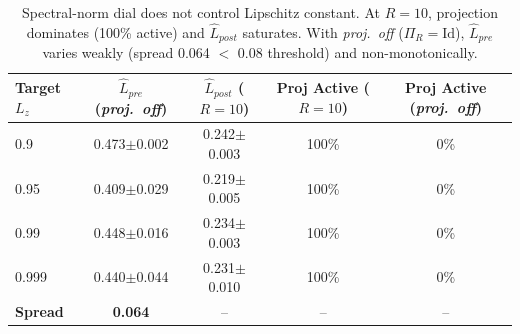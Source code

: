 \begin{table}[t]
\centering
\caption{Spectral-norm dial does not control Lipschitz constant. At $R{=}10$, projection dominates (100\% active) and $\hat{L}_{post}$ saturates. With \emph{proj.\ off} ($\Pi_R=\mathrm{Id}$), $\hat{L}_{pre}$ varies weakly (spread 0.064 $<$ 0.08 threshold) and non-monotonically.}
\label{tab:exp2_dial_failure}
\begin{tabular}{lcccc}
\toprule
Target $L_z$ & $\hat{L}_{pre}$ (\emph{proj.\ off}) & $\hat{L}_{post}$ ($R{=}10$) & Proj Active ($R{=}10$) & Proj Active (\emph{proj.\ off}) \\
\midrule
  0.9 & 0.473$\pm$0.002 & 0.242$\pm$0.003 & 100\% & 0\% \\
  0.95 & 0.409$\pm$0.029 & 0.219$\pm$0.005 & 100\% & 0\% \\
  0.99 & 0.448$\pm$0.016 & 0.234$\pm$0.003 & 100\% & 0\% \\
  0.999 & 0.440$\pm$0.044 & 0.231$\pm$0.010 & 100\% & 0\% \\
\midrule
  \textbf{Spread} & \textbf{0.064} & -- & -- & -- \\
\bottomrule
\end{tabular}
\end{table}

